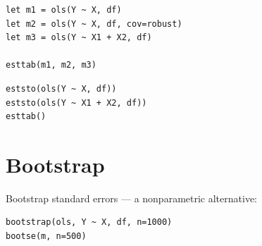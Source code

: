 \begin{lstlisting}[caption={Comparing specifications}]
let m1 = ols(Y ~ X, df)
let m2 = ols(Y ~ X, df, cov=robust)
let m3 = ols(Y ~ X1 + X2, df)

esttab(m1, m2, m3)
\end{lstlisting}

\begin{lstlisting}
eststo(ols(Y ~ X, df))
eststo(ols(Y ~ X1 + X2, df))
esttab()
\end{lstlisting}

\section{Bootstrap}

Bootstrap standard errors --- a nonparametric alternative:

\begin{lstlisting}
bootstrap(ols, Y ~ X, df, n=1000)
bootse(m, n=500)
\end{lstlisting}
